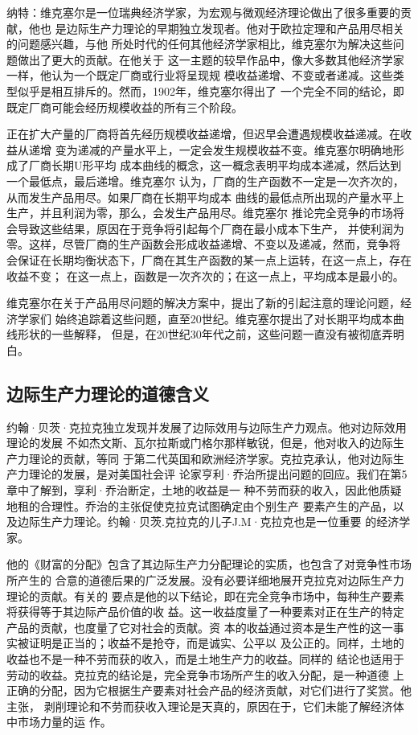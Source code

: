 纳特：维克塞尔是一位瑞典经济学家，为宏观与微观经济理论做出了很多重要的贡献，他也
是边际生产力理论的早期独立发现者。他对于欧拉定理和产品用尽相关的问题感兴趣，与他
所处时代的任何其他经济学家相比，维克塞尔为解决这些问题做出了更大的贡献。在他关于
这一主题的较早作品中，像大多数其他经济学家一样，他认为一个既定厂商或行业将呈现规
模收益递增、不变或者递减。这些类型似乎是相互排斥的。然而，1902年，维克塞尔得出了
一个完全不同的结论，即既定厂商可能会经历规模收益的所有三个阶段。

正在扩大产量的厂商将首先经历规模收益递增，但迟早会遭遇规模收益递减。在收益从递增
变为递减的产量水平上，一定会发生规模收益不变。维克塞尔明确地形成了厂商长期U形平均
成本曲线的概念，这一概念表明平均成本递减，然后达到一个最低点，最后递增。维克塞尔
认为，厂商的生产函数不一定是一次齐次的，从而发生产品用尽。如果厂商在长期平均成本
曲线的最低点所出现的产量水平上生产，并且利润为零，那么，会发生产品用尽。维克塞尔
推论完全竞争的市场将会导致这些结果，原因在于竞争将引起每个厂商在最小成本下生产，
并使利润为零。这样，尽管厂商的生产函数会形成收益递增、不变以及递减，然而，竞争将
会保证在长期均衡状态下，厂商在其生产函数的某一点上运转，在这一点上，存在收益不变；
在这一点上，函数是一次齐次的；在这一点上，平均成本是最小的。

维克塞尔在关于产品用尽问题的解决方案中，提出了新的引起注意的理论问题，经济学家们
始终追踪着这些问题，直至20世纪。维克塞尔提出了对长期平均成本曲线形状的一些解释，
但是，在20世纪30年代之前，这些问题一直没有被彻底弄明白。

\subsection{边际生产力理论的道德含义}

约翰·贝茨·克拉克独立发现并发展了边际效用与边际生产力观点。他对边际效用理论的发展
不如杰文斯、瓦尔拉斯或门格尔那样敏锐，但是，他对收入的边际生产力理论的贡献，等同
于第二代英国和欧洲经济学家。克拉克承认，他对边际生产力理论的发展，是对美国社会评
论家亨利·乔治所提出问题的回应。我们在第5章中了解到，享利·乔治断定，土地的收益是一
种不劳而获的收入，因此他质疑地租的合理性。乔治的主张促使克拉克试图确定由个别生产
要素产生的产品，以及边际生产力理论。约翰·贝茨.克拉克的儿子J.M·克拉克也是一位重要
的经济学家。

他的《财富的分配》包含了其边际生产力分配理论的实质，也包含了对竞争性市场所产生的
合意的道德后果的广泛发展。没有必要详细地展开克拉克对边际生产力理论的贡献。有关的
要点是他的以下结论，即在完全竞争市场中，每种生产要素将获得等于其边际产品价值的收
益。这一收益度量了一种要素对正在生产的特定产品的贡献，也度量了它对社会的贡献。资
本的收益通过资本是生产性的这一事实被证明是正当的；收益不是抢夺，而是诚实、公平以
及公正的。同样，土地的收益也不是一种不劳而获的收入，而是土地生产力的收益。同样的
结论也适用于劳动的收益。克拉克的结论是，完全竞争市场所产生的收入分配，是一种道德
上正确的分配，因为它根据生产要素对社会产品的经济贡献，对它们进行了奖赏。他主张，
剥削理论和不劳而获收入理论是天真的，原因在于，它们未能了解经济体中市场力量的运
作。

